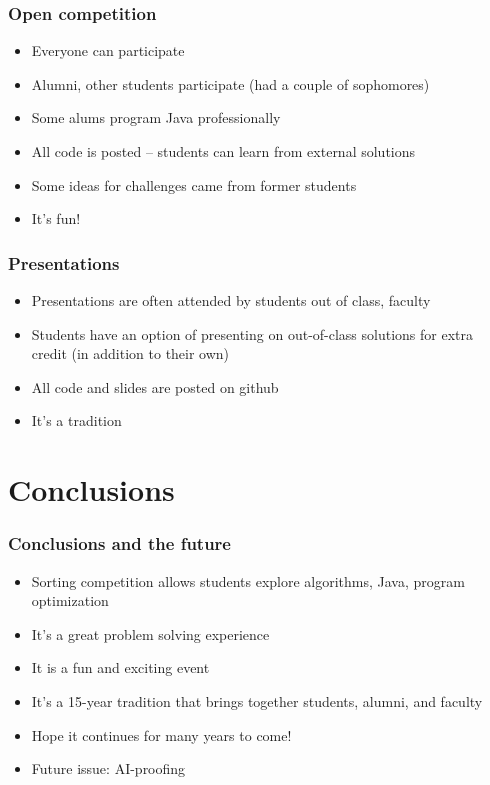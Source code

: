 \documentclass{beamer}
\begin{document}
\begin{frame}
\frametitle{Open competition}
 \begin{itemize}
\item Everyone can participate
\item Alumni, other students participate (had a couple of sophomores)
\item Some alums program Java professionally
\item All code is posted -- students can learn from external solutions
\item Some ideas for challenges came from former students
\item It's fun!
\end{itemize}
\end{frame}

\begin{frame}
\frametitle{Presentations}
\begin{itemize}
\item Presentations are often attended by students out of class, faculty
\item Students have an option of presenting on out-of-class solutions for extra credit (in addition to their own)
\item All code and slides are posted on github 
\item It's a tradition
\end{itemize}
\end{frame}

\section{Conclusions}

\begin{frame}
\frametitle{Conclusions and the future}
\begin{itemize}
\item Sorting competition allows students explore algorithms, Java, program optimization
\item It's a great problem solving experience
\item It is a fun and exciting event
\item It's a 15-year tradition that brings together students, alumni, and faculty
\item Hope it continues for many years to come!
\item Future issue: AI-proofing
\end{itemize}
\end{frame}
\end{document}
